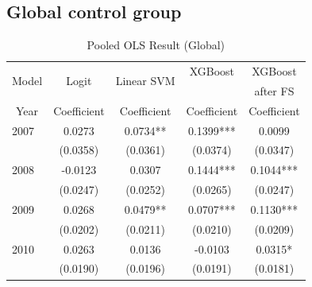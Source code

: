 \documentclass[11pt,a4paper,oneside]{article}
\begin{document}
\subsection{Global control group}
\begin{table}[!t]
	\centering
	\caption{Pooled OLS Result (Global)}
	\begin{threeparttable}
	\def\arraystretch{0.7}
	\begin{tabular}{*9c}
		\toprule 
		\multirow{2}{*}{Model}  & \multicolumn{2}{c}{\multirow{2}{*}{Logit}} & \multicolumn{2}{c}{\multirow{2}{*}{Linear SVM}} & \multicolumn{2}{c}{XGBoost} & \multicolumn{2}{c}{XGBoost}\\
		{} & \multicolumn{2}{c}{} & \multicolumn{2}{c}{} & \multicolumn{2}{c}{} & \multicolumn{2}{c}{after FS}\\
		{Year} & \multicolumn{2}{c}{Coefficient} & \multicolumn{2}{c}{Coefficient} & \multicolumn{2}{c}{Coefficient} & \multicolumn{2}{c}{Coefficient}\\
		\midrule
		\multicolumn{1}{l}{2007} & \multicolumn{2}{c}{0.0273} & \multicolumn{2}{c}{0.0734**} & \multicolumn{2}{c}{0.1399***}& \multicolumn{2}{c}{0.0099}\\
		\multicolumn{1}{l}{} & \multicolumn{2}{c}{(0.0358)} & \multicolumn{2}{c}{(0.0361)} & \multicolumn{2}{c}{(0.0374)}& \multicolumn{2}{c}{(0.0347)}\\
		
		\multicolumn{1}{l}{2008} & \multicolumn{2}{c}{-0.0123} & \multicolumn{2}{c}{0.0307} & \multicolumn{2}{c}{0.1444***}& \multicolumn{2}{c}{0.1044***}\\
		\multicolumn{1}{l}{} & \multicolumn{2}{c}{(0.0247)} & \multicolumn{2}{c}{(0.0252)} & \multicolumn{2}{c}{(0.0265)}& \multicolumn{2}{c}{(0.0247)}\\
		
		\multicolumn{1}{l}{2009} & \multicolumn{2}{c}{0.0268} & \multicolumn{2}{c}{0.0479**} & \multicolumn{2}{c}{0.0707***}& \multicolumn{2}{c}{0.1130***}\\
		\multicolumn{1}{l}{} & \multicolumn{2}{c}{(0.0202)} & \multicolumn{2}{c}{(0.0211)} & \multicolumn{2}{c}{(0.0210)}& \multicolumn{2}{c}{(0.0209)}\\
		
		\multicolumn{1}{l}{2010} & \multicolumn{2}{c}{0.0263} & \multicolumn{2}{c}{0.0136} & \multicolumn{2}{c}{-0.0103} & \multicolumn{2}{c}{0.0315*}\\
		\multicolumn{1}{l}{} & \multicolumn{2}{c}{(0.0190)} & \multicolumn{2}{c}{(0.0196)} & \multicolumn{2}{c}{(0.0191)}& \multicolumn{2}{c}{(0.0181)}\\
		

\end{tabular}
\end{threeparttable}
\end{table}
\end{document}
